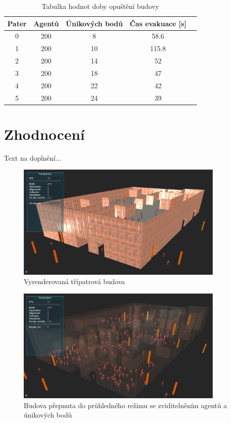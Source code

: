 \documentclass[czech,public,dept460,male,cpdeclaration]{diploma}
\begin{document}
\begin{table}[H]
	\centering
	\caption{Tabulka hodnot doby opuštění budovy}
	\label{tab:tabletime}
	\renewcommand{\arraystretch}{1.0}
	\begin{tabular}{| c | c | c | c | c |}
		\hline
		Pater & Agentů & Únikových bodů & Čas evakuace [s]\\\hline
		0 & 200 & 8 & 58.6\\
		1 & 200 & 10 & 115.8\\
		2 & 200 & 14 & 52\\
		3 & 200 & 18 & 47\\
		4 & 200 & 22 & 42\\
		5 & 200 & 24 & 39\\
		\hline
	\end{tabular}
\end{table}

\newpage
\section{Zhodnocení}

Text na doplnění...

\begin{figure}[H]\centering\includegraphics[width=0.9\textwidth]{Figures/screen1.jpg}
	\caption{Vyrenderovaná třípatrová budova}
\end{figure}

\begin{figure}[H]\centering\includegraphics[width=0.9\textwidth]{Figures/screen4.jpg}
	\caption{Budova přepnuta do průhledného režimu se zviditelněním agentů a únikových bodů}
\end{figure}
\end{document}
